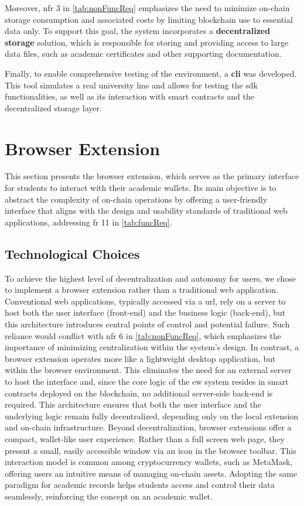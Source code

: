 Moreover, \gls{nfr} 3 in \cref{tab:nonFuncReq} emphasizes the need to minimize on-chain storage consumption and associated costs by limiting blockchain use to essential data only. To support this goal, the system incorporates a \textbf{decentralized storage} solution, which is responsible for storing and providing access to large data files, such as academic certificates and other supporting documentation.

Finally, to enable comprehensive testing of the environment, a \textbf{\gls{cli}} was developed. This tool simulates a real university \gls{lms} and allows for testing the \gls{sdk} functionalities, as well as its interaction with smart contracts and the decentralized storage layer.

 \section{Browser Extension}
\label{sec:browserExtensionDesign}
This section presents the browser extension, which serves as the primary interface for students to interact with their academic wallets. Its main objective is to abstract the complexity of on-chain operations by offering a user-friendly interface that aligns with the design and usability standards of traditional web applications, addressing \gls{fr} 11 in \cref{tab:funcReq}.

\subsection{Technological Choices}
To achieve the highest level of decentralization and autonomy for users, we chose to implement a browser extension rather than a traditional web application. Conventional web applications, typically accessed via a \gls{url}, rely on a server to host both the user interface (front-end) and the business logic (back-end), but this architecture introduces central points of control and potential failure. Such reliance would conflict with \gls{nfr} 6 in \cref{tab:nonFuncReq}, which emphasizes the importance of minimizing centralization within the system's design.
In contrast, a browser extension operates more like a lightweight desktop application, but within the browser environment. This eliminates the need for an external server to host the interface and, since the core logic of the \gls{ew} system resides in smart contracts deployed on the blockchain, no additional server-side back-end is required. This architecture ensures that both the user interface and the underlying logic remain fully decentralized, depending only on the local extension and on-chain infrastructure.
Beyond decentralization, browser extensions offer a compact, wallet-like user experience. Rather than a full screen web page, they present a small, easily accessible window via an icon in the browser toolbar. This interaction model is common among cryptocurrency wallets, such as MetaMask, offering users an intuitive means of managing on-chain assets. Adopting the same paradigm for academic records helps students access and control their data seamlessly, reinforcing the concept on an academic wallet.

